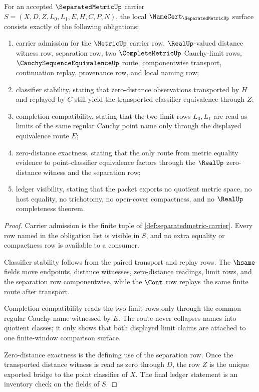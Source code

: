 \begin{theorem}\label{thm:separatedmetric-namecert-obligations}
For an accepted $\SeparatedMetricUp$ carrier $S=(X,D,Z,L_0,L_1,E,H,C,P,N)$, the local $\NameCert_{\SeparatedMetricUp}$ surface consists exactly of the following obligations:
\begin{enumerate}
\item carrier admission for the $\MetricUp$ carrier row, $\RealUp$-valued distance witness row, separation row, two $\CompleteMetricUp$ Cauchy-limit rows, $\CauchySequenceEquivalenceUp$ route, componentwise transport, continuation replay, provenance row, and local naming row;
\item classifier stability, stating that zero-distance observations transported by $H$ and replayed by $C$ still yield the transported classifier equivalence through $Z$;
\item completion compatibility, stating that the two limit rows $L_0,L_1$ are read as limits of the same regular Cauchy point name only through the displayed equivalence route $E$;
\item zero-distance exactness, stating that the only route from metric equality evidence to point-classifier equivalence factors through the $\RealUp$ zero-distance witness and the separation row;
\item ledger visibility, stating that the packet exports no quotient metric space, no host equality, no trichotomy, no open-cover compactness, and no $\RealUp$ completeness theorem.
\end{enumerate}
\end{theorem}
\begin{proof}
Carrier admission is the finite tuple of \autoref{def:separatedmetric-carrier}. Every row named in the obligation list is visible in $S$, and no extra equality or compactness row is available to a consumer.

Classifier stability follows from the paired transport and replay rows. The $\hsame$ fields move endpoints, distance witnesses, zero-distance readings, limit rows, and the separation row componentwise, while the $\Cont$ row replays the same finite route after transport.

Completion compatibility reads the two limit rows only through the common regular Cauchy name witnessed by $E$. The route never collapses names into quotient classes; it only shows that both displayed limit claims are attached to one finite-window comparison surface.

Zero-distance exactness is the defining use of the separation row. Once the transported distance witness is read as zero through $D$, the row $Z$ is the unique exported bridge to the point classifier of $X$. The final ledger statement is an inventory check on the fields of $S$.
\end{proof}


